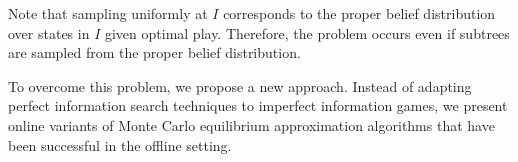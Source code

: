 \documentclass[letterpaper]{article}
\begin{document}
Note that sampling uniformly at $I$ corresponds to the proper belief distribution over states in $I$ given optimal play. Therefore, the problem occurs even if subtrees are sampled from the proper belief distribution. 

To overcome this problem, we propose a new approach. Instead of adapting perfect information search techniques to imperfect information games, we present online variants of Monte Carlo equilibrium approximation algorithms that have been successful in the offline setting. 





\end{document}
